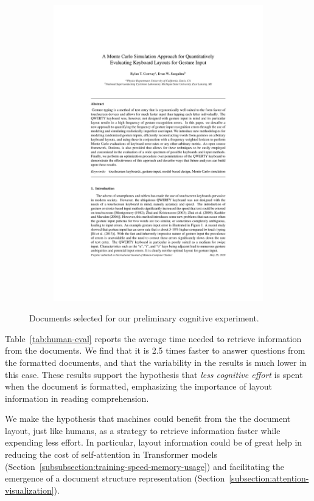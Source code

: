 \begin{figure}[!htbp]
\begin{subfigure}[b]{0.24\textwidth}
        \includegraphics[width=\textwidth]{images/chapter3/formatted_sample4.pdf}
      \end{subfigure}
      \caption{Documents selected for our preliminary cognitive experiment.}
      \label{fig:samples-chapter3}
\end{figure}

Table~\ref{tab:human-eval} reports the average time needed to retrieve information from the documents. We find that it is 2.5 times faster to answer questions from the formatted documents, and that the variability in the results is much lower in this case. These results support the hypothesis that \emph{less cognitive effort} is spent when the document is formatted, emphasizing the importance of layout information in reading comprehension.

We make the hypothesis that machines could benefit from the the document layout, just like humans, as a strategy to retrieve information faster while expending less effort. In particular, layout information could be of great help in reducing the cost of self-attention in Transformer models (Section~\ref{subsubsection:training-speed-memory-usage}) and facilitating the emergence of a document structure representation (Section~\ref{subsection:attention-visualization}).

